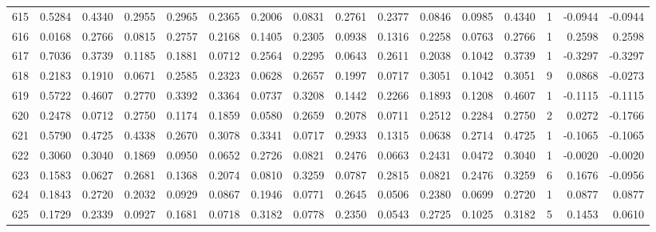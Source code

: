 \begin{tabular}{lrrrrrrrrrrrrrrr}
615 &      0.5284 &  0.4340 &  0.2955 &  0.2965 &  0.2365 &  0.2006 &  0.0831 &  0.2761 &  0.2377 &  0.0846 &   0.0985 &     0.4340 &      1 &                   -0.0944 &                    -0.0944 \\
616 &      0.0168 &  0.2766 &  0.0815 &  0.2757 &  0.2168 &  0.1405 &  0.2305 &  0.0938 &  0.1316 &  0.2258 &   0.0763 &     0.2766 &      1 &                    0.2598 &                     0.2598 \\
617 &      0.7036 &  0.3739 &  0.1185 &  0.1881 &  0.0712 &  0.2564 &  0.2295 &  0.0643 &  0.2611 &  0.2038 &   0.1042 &     0.3739 &      1 &                   -0.3297 &                    -0.3297 \\
618 &      0.2183 &  0.1910 &  0.0671 &  0.2585 &  0.2323 &  0.0628 &  0.2657 &  0.1997 &  0.0717 &  0.3051 &   0.1042 &     0.3051 &      9 &                    0.0868 &                    -0.0273 \\
619 &      0.5722 &  0.4607 &  0.2770 &  0.3392 &  0.3364 &  0.0737 &  0.3208 &  0.1442 &  0.2266 &  0.1893 &   0.1208 &     0.4607 &      1 &                   -0.1115 &                    -0.1115 \\
620 &      0.2478 &  0.0712 &  0.2750 &  0.1174 &  0.1859 &  0.0580 &  0.2659 &  0.2078 &  0.0711 &  0.2512 &   0.2284 &     0.2750 &      2 &                    0.0272 &                    -0.1766 \\
621 &      0.5790 &  0.4725 &  0.4338 &  0.2670 &  0.3078 &  0.3341 &  0.0717 &  0.2933 &  0.1315 &  0.0638 &   0.2714 &     0.4725 &      1 &                   -0.1065 &                    -0.1065 \\
622 &      0.3060 &  0.3040 &  0.1869 &  0.0950 &  0.0652 &  0.2726 &  0.0821 &  0.2476 &  0.0663 &  0.2431 &   0.0472 &     0.3040 &      1 &                   -0.0020 &                    -0.0020 \\
623 &      0.1583 &  0.0627 &  0.2681 &  0.1368 &  0.2074 &  0.0810 &  0.3259 &  0.0787 &  0.2815 &  0.0821 &   0.2476 &     0.3259 &      6 &                    0.1676 &                    -0.0956 \\
624 &      0.1843 &  0.2720 &  0.2032 &  0.0929 &  0.0867 &  0.1946 &  0.0771 &  0.2645 &  0.0506 &  0.2380 &   0.0699 &     0.2720 &      1 &                    0.0877 &                     0.0877 \\
625 &      0.1729 &  0.2339 &  0.0927 &  0.1681 &  0.0718 &  0.3182 &  0.0778 &  0.2350 &  0.0543 &  0.2725 &   0.1025 &     0.3182 &      5 &                    0.1453 &                     0.0610 \\

\end{tabular}
